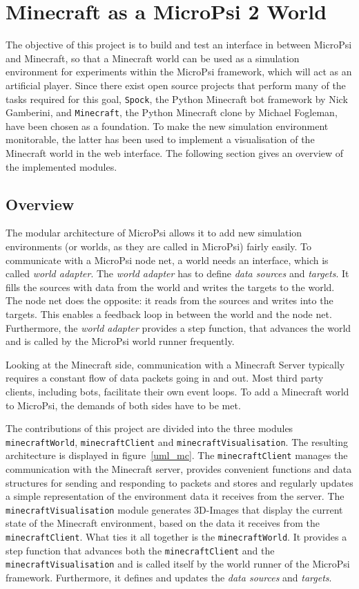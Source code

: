 \chapter{Minecraft as a MicroPsi 2 World}
The objective of this project is to build and test an interface in between MicroPsi and Minecraft, so that a Minecraft world can be used as a simulation environment for experiments within the MicroPsi framework, which will act as an artificial player. Since there exist open source projects that perform many of the tasks required for this goal, \texttt{Spock}, the Python Minecraft bot framework by Nick Gamberini, and \texttt{Minecraft}, the Python Minecraft clone by Michael Fogleman, have been chosen as a foundation. To make the new simulation environment monitorable, the latter has been used to implement a visualisation of the Minecraft world in the web interface. The following section gives an overview of the implemented modules.

\section{Overview}
The modular architecture of MicroPsi allows it to add new simulation environments (or worlds, as they are called in MicroPsi) fairly easily. To communicate with a MicroPsi node net, a world needs an interface, which is called \emph{world adapter}. The \emph{world adapter} has to define \emph{data sources} and \emph{targets}. It fills the sources with data from the world and writes the targets to the world. The node net does the opposite: it reads from the sources and writes into the targets. This enables a feedback loop in between the world and the node net. Furthermore, the \emph{world adapter} provides a step function, that advances the world and is called by the MicroPsi world runner frequently.

Looking at the Minecraft side, communication with a Minecraft Server typically requires a constant flow of data packets going in and out. Most third party clients, including bots, facilitate their own event loops. To add a Minecraft world to MicroPsi, the demands of both sides have to be met.

The contributions of this project are divided into the three modules \texttt{minecraftWorld}, \texttt{minecraftClient} and \texttt{minecraftVisualisation}. The resulting architecture is displayed in figure~\ref{uml_mc}. The \texttt{minecraftClient} manages the communication with the Minecraft server, provides convenient functions and data structures for sending and responding to packets and stores and regularly updates a simple representation of the environment data it receives from the server. The \texttt{minecraftVisualisation} module generates 3D-Images that display the current state of the Minecraft environment, based on the data it receives from the \texttt{minecraftClient}. What ties it all together is the \texttt{minecraftWorld}. It provides a step function that advances both the \texttt{minecraftClient} and the \texttt{minecraftVisualisation} and is called itself by the world runner of the MicroPsi framework. Furthermore, it defines and updates the \emph{data sources} and \emph{targets}.

